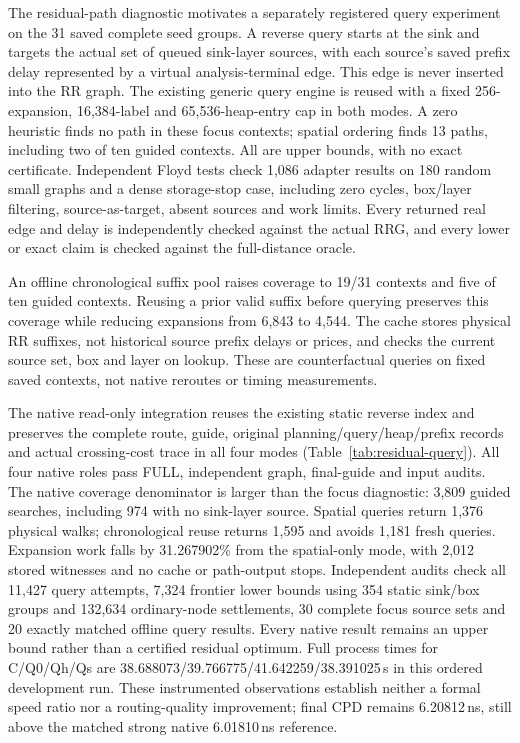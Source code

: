 
The residual-path diagnostic motivates a separately registered query experiment on the 31 saved complete seed groups. A reverse query starts at the sink and targets the actual set of queued sink-layer sources, with each source's saved prefix delay represented by a virtual analysis-terminal edge. This edge is never inserted into the RR graph. The existing generic query engine is reused with a fixed 256-expansion, 16,384-label and 65,536-heap-entry cap in both modes. A zero heuristic finds no path in these focus contexts; spatial ordering finds 13 paths, including two of ten guided contexts. All are upper bounds, with no exact certificate. Independent Floyd tests check 1,086 adapter results on 180 random small graphs and a dense storage-stop case, including zero cycles, box/layer filtering, source-as-target, absent sources and work limits. Every returned real edge and delay is independently checked against the actual RRG, and every lower or exact claim is checked against the full-distance oracle.

An offline chronological suffix pool raises coverage to 19/31 contexts and five of ten guided contexts. Reusing a prior valid suffix before querying preserves this coverage while reducing expansions from 6,843 to 4,544. The cache stores physical RR suffixes, not historical source prefix delays or prices, and checks the current source set, box and layer on lookup. These are counterfactual queries on fixed saved contexts, not native reroutes or timing measurements.

The native read-only integration reuses the existing static reverse index and preserves the complete route, guide, original planning/query/heap/prefix records and actual crossing-cost trace in all four modes (Table~\ref{tab:residual-query}). All four native roles pass FULL, independent graph, final-guide and input audits. The native coverage denominator is larger than the focus diagnostic: 3,809 guided searches, including 974 with no sink-layer source. Spatial queries return 1,376 physical walks; chronological reuse returns 1,595 and avoids 1,181 fresh queries. Expansion work falls by 31.267902\% from the spatial-only mode, with 2,012 stored witnesses and no cache or path-output stops. Independent audits check all 11,427 query attempts, 7,324 frontier lower bounds using 354 static sink/box groups and 132,634 ordinary-node settlements, 30 complete focus source sets and 20 exactly matched offline query results. Every native result remains an upper bound rather than a certified residual optimum. Full process times for C/Q0/Qh/Qs are 38.688073/39.766775/41.642259/38.391025\,s in this ordered development run. These instrumented observations establish neither a formal speed ratio nor a routing-quality improvement; final CPD remains 6.20812\,ns, still above the matched strong native 6.01810\,ns reference.

